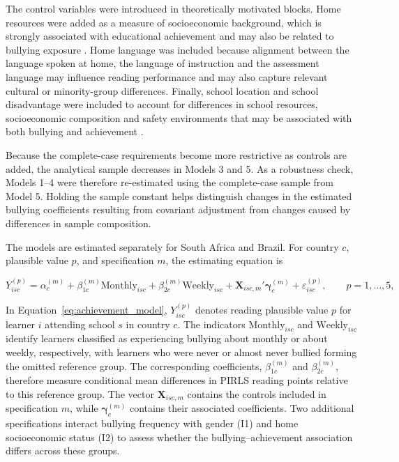 The control variables were introduced in theoretically motivated blocks.
Home resources were added as a measure
of socioeconomic background, which is strongly associated with
educational achievement and may also be related to bullying exposure
\citep{sbrogliorizzotto2021bullying}. Home language was included because
alignment between the language spoken at home, the language of
instruction and the assessment language may influence reading performance
and may also capture relevant cultural or minority-group differences.
Finally, school location and school disadvantage were included to account
for differences in school resources, socioeconomic composition and safety
environments that may be associated with both bullying and achievement
\citep{anton_erxleben2016bullying,juan2025risk}.

 Because the complete-case requirements become more restrictive as controls are added, the analytical sample decreases in Models 3 and 5. As a robustness check, Models 1–4 were therefore re-estimated using the complete-case sample from Model 5. Holding the sample constant helps distinguish changes in the estimated bullying coefficients resulting from covariant adjustment from changes caused by differences in sample composition.


The models are estimated separately for South Africa and Brazil. For country $c$, plausible value $p$, and specification $m$, the estimating equation is

\begin{equation}
Y_{isc}^{(p)} = \alpha_{c}^{(m)}
+ \beta_{1c}^{(m)}\text{Monthly}_{isc}
+ \beta_{2c}^{(m)}\text{Weekly}_{isc}
+ \mathbf{X}_{isc,m}'\boldsymbol{\gamma}_{c}^{(m)}
+ \varepsilon_{isc}^{(p)},
\qquad p=1,\ldots,5,
\label{eq:achievement_model}
\end{equation}

In Equation~\ref{eq:achievement_model}, \(Y_{isc}^{(p)}\) denotes reading
plausible value \(p\) for learner \(i\) attending school \(s\) in country
\(c\). The indicators \(\text{Monthly}_{isc}\) and
\(\text{Weekly}_{isc}\) identify learners classified as experiencing
bullying about monthly or about weekly, respectively, with learners who
were never or almost never bullied forming the omitted reference group.
The corresponding coefficients, \(\beta_{1c}^{(m)}\) and
\(\beta_{2c}^{(m)}\), therefore measure conditional mean differences in
PIRLS reading points relative to this reference group. The vector
\(\mathbf{X}_{isc,m}\) contains the controls included in specification
\(m\), while \(\boldsymbol{\gamma}_c^{(m)}\) contains their associated
coefficients.
Two additional specifications interact bullying frequency with gender (I1) and home socioeconomic status (I2) to assess whether the bullying–achievement association differs across these groups.

